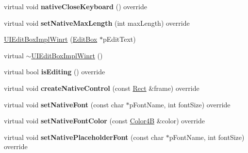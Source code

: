 \begin{DoxyCompactItemize}
\item 
\mbox{\label{classui_1_1UIEditBoxImplWinrt_ae148f2c1de85c20b2f0a74c29decea12}} 
virtual void {\bfseries native\+Close\+Keyboard} () override
\item 
\mbox{\label{classui_1_1UIEditBoxImplWinrt_a95a24eaf431472ff2aa2024799f50c0a}} 
virtual void {\bfseries set\+Native\+Max\+Length} (int max\+Length) override
\item 
\hyperlink{classui_1_1UIEditBoxImplWinrt_ac56d57e56787b19d1a91d76f7a280f39}{U\+I\+Edit\+Box\+Impl\+Winrt} (\hyperlink{classui_1_1EditBox}{Edit\+Box} $\ast$p\+Edit\+Text)
\item 
virtual \hyperlink{classui_1_1UIEditBoxImplWinrt_afa4a487089107a6f4cf5f5e0ffe8dd3b}{$\sim$\+U\+I\+Edit\+Box\+Impl\+Winrt} ()
\item 
\mbox{\label{classui_1_1UIEditBoxImplWinrt_afcaec5e71dbd84cd7302280bb8ffe54a}} 
virtual bool {\bfseries is\+Editing} () override
\item 
\mbox{\label{classui_1_1UIEditBoxImplWinrt_a5438a1e91955a8d58fd9f2327320082d}} 
virtual void {\bfseries create\+Native\+Control} (const \hyperlink{classRect}{Rect} \&frame) override
\item 
\mbox{\label{classui_1_1UIEditBoxImplWinrt_a86d46b38d200ff2d1baf106972e80c9a}} 
virtual void {\bfseries set\+Native\+Font} (const char $\ast$p\+Font\+Name, int font\+Size) override
\item 
\mbox{\label{classui_1_1UIEditBoxImplWinrt_ad6c5074291ea66535ff01558fdc11312}} 
virtual void {\bfseries set\+Native\+Font\+Color} (const \hyperlink{structColor4B}{Color4B} \&color) override
\item 
\mbox{\label{classui_1_1UIEditBoxImplWinrt_a3c62f197559bc59eb61e9931adcdc06e}} 
virtual void {\bfseries set\+Native\+Placeholder\+Font} (const char $\ast$p\+Font\+Name, int font\+Size) override
\item 
\mbox{\label{classui_1_1UIEditBoxImplWinrt_a7839bc43b2d46924fbae47439ce12990}} 

\end{DoxyCompactItemize}
